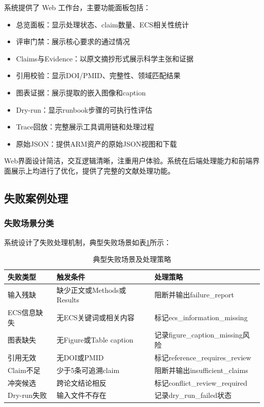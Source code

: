 ﻿\documentclass[a4paper,12pt]{article}
\begin{document}
系统提供了 Web 工作台，主要功能面板包括：

\begin{itemize}
    \item 总览面板：显示处理状态、claim数量、ECS相关性统计
    \item 评审门禁：展示核心要求的通过情况
    \item Claims与Evidence：以原文摘抄形式展示科学主张和证据
    \item 引用校验：显示DOI/PMID、完整性、领域匹配结果
    \item 图表证据：展示提取的嵌入图像和caption
    \item Dry-run：显示runbook步骤的可执行性评估
    \item Trace回放：完整展示工具调用链和处理过程
    \item 原始JSON：提供ARM资产的原始JSON视图和下载
\end{itemize}

Web界面设计简洁，交互逻辑清晰，注重用户体验。系统在后端处理能力和前端界面展示上均进行了优化，提供了完整的文献处理功能。

\subsection{失败案例处理}

\subsubsection{失败场景分类}

系统设计了失败处理机制，典型失败场景如表\ref{tab:failure_cases}所示：

\begin{table}[H]
\centering
\caption{典型失败场景及处理策略}
\label{tab:failure_cases}
\renewcommand{\arraystretch}{1.2}
\begin{tabular}{p{3cm}p{4.5cm}p{4.5cm}}
\toprule
\textbf{失败类型} & \textbf{触发条件} & \textbf{处理策略} \\
\midrule
输入残缺 & 缺少正文或Methods或Results & 阻断并输出failure\_report \\
ECS信息缺失 & 无ECS关键词或相关内容 & 标记ecs\_information\_missing \\
图表缺失 & 无Figure或Table caption & 记录figure\_caption\_missing风险 \\
引用无效 & 无DOI或PMID & 标记reference\_requires\_review \\
Claim不足 & 少于5条可追溯claim & 阻断并输出insufficient\_claims \\
冲突候选 & 跨论文结论相反 & 标记conflict\_review\_required \\
Dry-run失败 & 输入文件不存在 & 记录dry\_run\_failed状态 \\
\bottomrule
\end{tabular}
\end{table}
\end{document}
